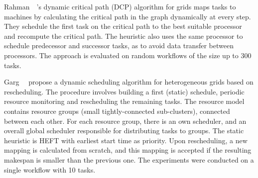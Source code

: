 \documentclass[conference]{IEEEtran}
\begin{document}
    Rahman~\etal~\cite{rahman2013}'s dynamic critical path (DCP) algorithm for grids maps tasks to machines
    by calculating the critical path in the graph dynamically at every step.
    They schedule the first task on the critical path to the best suitable processor and recompute the critical path.
    The heuristic also uses the same processor to schedule predecessor and successor tasks, as to avoid data transfer between processors.
    The approach is evaluated on random workflows of the size up to 300 tasks.


    Garg~\etal~\cite{GARG2015256} propose a dynamic scheduling algorithm for heterogeneous grids based on rescheduling.
    The procedure involves building a first (static) schedule, periodic resource monitoring and rescheduling the remaining
    tasks.
    The resource model contains resource groups (small tightly-connected sub-clusters), connected between each other.
    For each resource group, there is an own scheduler, and an overall global scheduler responsible for distributing
    tasks to groups.
    The static heuristic is HEFT with earliest start time as priority.
    Upon rescheduling, a new mapping is calculated from scratch, and this mapping is accepted if the resulting makespan
    is smaller than the previous one.
    The experiments were conducted on a single workflow with 10 tasks.
%

\end{document}
